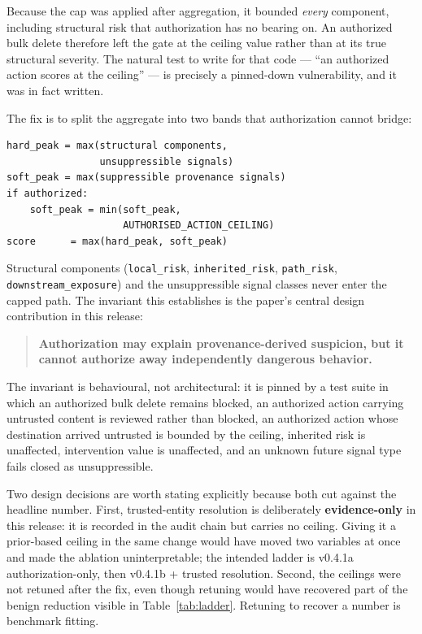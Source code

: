 \documentclass[letterpaper,twocolumn,10pt]{article}
\begin{document}
Because the cap was applied after aggregation, it bounded \emph{every}
component, including structural risk that authorization has no bearing on. An
authorized bulk delete therefore left the gate at the ceiling value rather than
at its true structural severity. The natural test to write for that code ---
``an authorized action scores at the ceiling'' --- is precisely a pinned-down
vulnerability, and it was in fact written.

The fix is to split the aggregate into two bands that authorization cannot
bridge:

{\small
\begin{verbatim}
hard_peak = max(structural components,
                unsuppressible signals)
soft_peak = max(suppressible provenance signals)
if authorized:
    soft_peak = min(soft_peak,
                    AUTHORISED_ACTION_CEILING)
score      = max(hard_peak, soft_peak)
\end{verbatim}
}

Structural components (\texttt{local\_risk}, \texttt{inherited\_risk},
\texttt{path\_risk}, \texttt{downstream\_exposure}) and the unsuppressible
signal classes never enter the capped path. The invariant this establishes is
the paper's central design contribution in this release:

\begin{quote}
\textbf{Authorization may explain provenance-derived suspicion, but it cannot
authorize away independently dangerous behavior.}
\end{quote}

The invariant is behavioural, not architectural: it is pinned by a test suite in
which an authorized bulk delete remains blocked, an authorized action carrying
untrusted content is reviewed rather than blocked, an authorized action whose
destination arrived untrusted is bounded by the ceiling, inherited risk is
unaffected, intervention value is unaffected, and an unknown future signal type
fails closed as unsuppressible.

Two design decisions are worth stating explicitly because both cut against the
headline number. First, trusted-entity resolution is deliberately
\textbf{evidence-only} in this release: it is recorded in the audit chain but
carries no ceiling. Giving it a prior-based ceiling in the same change would
have moved two variables at once and made the ablation uninterpretable; the
intended ladder is v0.4.1a authorization-only, then v0.4.1b + trusted
resolution. Second, the ceilings were not retuned after the fix, even though
retuning would have recovered part of the benign reduction visible in
Table~\ref{tab:ladder}. Retuning to recover a number is benchmark fitting.
\end{document}
